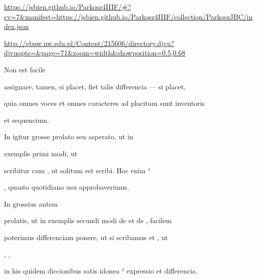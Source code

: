 
\newParkoszpage


{
  \url{https://jsbien.github.io/Parkosz4IIIF/\#?cv=7&manifest=https://jsbien.github.io/Parkosz4IIIF/collection/ParkoszJBC/index.json}
  
\url{http://ebuw.uw.edu.pl/Content/215606/directory.djvu?djvuopts=&page=71&zoom=width&showposition=0.5,0.68}
}

\bigskip

\obeylines
\mono


\fullpreviouslines


{
\color{blue}
Non est facile 

assignare, tamen, si placet, fiet talis differencia — si placet,

}


\fulllines
quia omnes voces et omnes caracteres ad placitum sunt inventoris

\splitlines
et sequencium.

\indentK In  igitur grosse prolato seu asperato, ut in

\fulllines

exemplis primi modi, ut     

scribitur  cum , ut solitum est scribi. Hoc enim ¹ 

\splitlines

, quanto quotidiano usu approbaverimus.

\indentK In grossius autem

\fulllines

prolatis, ut in exemplis secundi modi de  et de , facilem

poterimus differenciam ponere, ut si scribamus  et , ut 

,     ,

in his quidem diccionibus satis idonea ¹ expressio et differencia.

